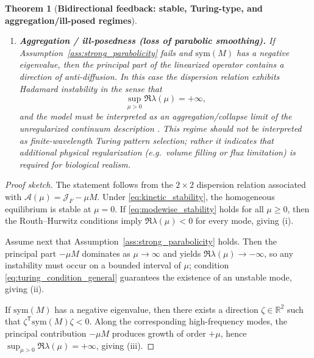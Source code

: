 \documentclass[pdflatex,sn-mathphys-ay]{sn-jnl}
\theoremstyle{thmstyleone}
\newtheorem{theorem}{Theorem}[section]
\theoremstyle{definition}
\theoremstyle{remark}
\begin{document}
\begin{theorem}[\textbf{Bidirectional feedback: stable, Turing-type, and aggregation/ill-posed regimes}]
\begin{enumerate}[label=(\roman*)]
\item \textbf{Aggregation / ill-posedness (loss of parabolic smoothing).}
If Assumption~\ref{ass:strong_parabolicity} fails and $\mathrm{sym}(M)$ has a negative eigenvalue, then the principal part of the linearized operator contains a direction of anti-diffusion. 
In this case the dispersion relation exhibits Hadamard instability in the sense that
\[
\sup_{\mu>0}\Re\lambda(\mu)=+\infty,
\]
and the model must be interpreted as an aggregation/collapse limit of the unregularized continuum description \citep{joseph1990hadamard}. 
This regime should not be interpreted as finite-wavelength Turing pattern selection; rather it indicates that additional physical regularization (e.g.\ volume filling or flux limitation) is required for biological realism.
\end{enumerate}
\end{theorem}

\begin{proof}[Proof sketch]
The statement follows from the $2\times 2$ dispersion relation associated with $\mathcal{A}(\mu)=\mathcal{J}_F-\mu M$. 
Under \eqref{eq:kinetic_stability}, the homogeneous equilibrium is stable at $\mu=0$. 
If \eqref{eq:modewise_stability} holds for all $\mu\ge 0$, then the Routh--Hurwitz conditions imply $\Re\lambda(\mu)<0$ for every mode, giving (i).

Assume next that Assumption~\ref{ass:strong_parabolicity} holds. 
Then the principal part $-\mu M$ dominates as $\mu\to\infty$ and yields $\Re\lambda(\mu)\to -\infty$, so any instability must occur on a bounded interval of $\mu$; condition \eqref{eq:turing_condition_general} guarantees the existence of an unstable mode, giving (ii).

If $\mathrm{sym}(M)$ has a negative eigenvalue, then there exists a direction $\zeta\in\mathbb{R}^2$ such that $\zeta^{\mathsf T}\mathrm{sym}(M)\zeta<0$. 
Along the corresponding high-frequency modes, the principal contribution $-\mu M$ produces growth of order $+\mu$, hence $\sup_{\mu>0}\Re\lambda(\mu)=+\infty$, giving (iii).
\end{proof}
\end{document}
